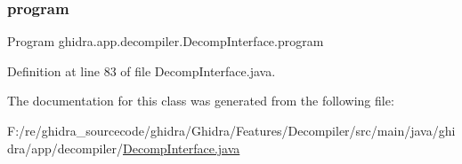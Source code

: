 \subsubsection{\texorpdfstring{program}{program}}
{\footnotesize\ttfamily Program ghidra.\+app.\+decompiler.\+Decomp\+Interface.\+program\hspace{0.3cm}{\ttfamily [protected]}}



Definition at line 83 of file Decomp\+Interface.\+java.



The documentation for this class was generated from the following file\+:\begin{DoxyCompactItemize}
\item 
F\+:/re/ghidra\+\_\+sourcecode/ghidra/\+Ghidra/\+Features/\+Decompiler/src/main/java/ghidra/app/decompiler/\mbox{\hyperlink{_decomp_interface_8java}{Decomp\+Interface.\+java}}\end{DoxyCompactItemize}
